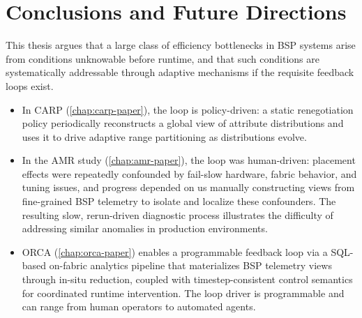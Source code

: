 \chapter{Conclusions and Future Directions}\label{chap:concl}
\begin{center}
  \begin{minipage}{0.95\textwidth}
    \minitoc
  \end{minipage}
\end{center}




This thesis argues that a large class of efficiency bottlenecks in BSP systems arise from
conditions unknowable before runtime, and that such conditions are systematically addressable
through adaptive mechanisms if the requisite feedback loops exist.

\begin{itemize}
  \item In CARP (\cref{chap:carp-paper}), the loop is policy-driven: a static renegotiation policy
        periodically reconstructs a
        global view of attribute distributions and uses it to drive adaptive range partitioning
        as distributions evolve.

  \item In the AMR study (\cref{chap:amr-paper}), the loop was human-driven: placement effects were
        repeatedly confounded
        by fail-slow hardware, fabric behavior, and tuning issues, and progress depended on
        us manually constructing views from fine-grained BSP telemetry to isolate and localize
        these confounders.
        The resulting slow, rerun-driven diagnostic process illustrates the difficulty of
        addressing similar anomalies in production environments.

  \item ORCA (\cref{chap:orca-paper}) enables a programmable feedback loop via a SQL-based on-fabric
        analytics pipeline that
        materializes BSP telemetry views through in-situ reduction, coupled with
        timestep-consistent control semantics for coordinated runtime intervention.
        The loop driver is programmable and can range from human operators to automated agents.
\end{itemize}

